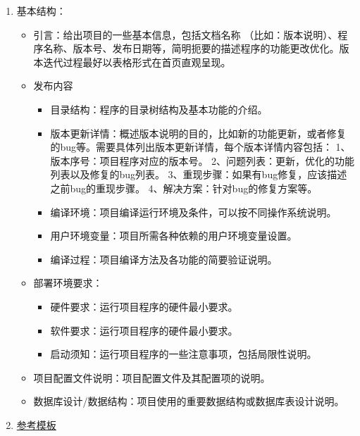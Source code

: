 \begin{enumerate}
  \item 基本结构：
        \begin{itemize}
          \item 引言：给出项目的一些基本信息，包括文档名称 （比如：版本说明）、程序名称、版本号、发布日期等，简明扼要的描述程序的功能更改优化。版本迭代过程最好以表格形式在首页直观呈现。
          \item 发布内容
              \begin{itemize}
          	      \item 目录结构：程序的目录树结构及基本功能的介绍。
          	      \item 版本更新详情：概述版本说明的目的，比如新的功能更新，或者修复的bug等。需要具体列出版本更新详情，每个版本详情内容包括：
          	      1、版本序号：项目程序对应的版本号。
          	      2、问题列表：更新，优化的功能列表以及修复的bug列表。
          	      3、重现步骤：如果有bug修复，应该描述之前bug的重现步骤。
          	      4、解决方案：针对bug的修复方案等。
          	      \item 编译环境：项目编译运行环境及条件，可以按不同操作系统说明。
          	      \item 用户环境变量：项目所需各种依赖的用户环境变量设置。
          	      \item 编译过程：项目编译方法及各功能的简要验证说明。
             \end{itemize}
          \item 部署环境要求：
             \begin{itemize}
             	\item 硬件要求：运行项目程序的硬件最小要求。
            	\item 软件要求：运行项目程序的硬件最小要求。
          	    \item 启动须知：运行项目程序的一些注意事项，包括局限性说明。
            \end{itemize}
          \item 项目配置文件说明：项目配置文件及其配置项的说明。
          \item 数据库设计/数据结构：项目使用的重要数据结构或数据库表设计说明。
        \end{itemize}
  \item \href{https://www.cnblogs.com/wj-1314/p/8547763.html} {参考模板}
\end{enumerate}


